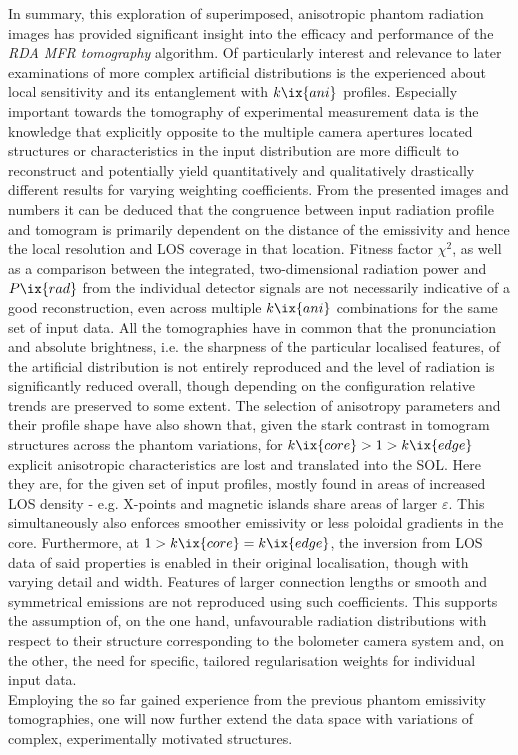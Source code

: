                In summary, this exploration of superimposed, anisotropic phantom radiation images has provided significant insight into the efficacy and performance of the \textit{RDA MFR tomography} algorithm. Of particularly interest and relevance to later examinations of more complex artificial distributions is the experienced about local sensitivity and its entanglement with $k\ix{ani}$ profiles. Especially important towards the tomography of experimental measurement data is the knowledge that explicitly opposite to the multiple camera apertures located structures or characteristics in the input distribution are more difficult to reconstruct and potentially yield quantitatively and qualitatively drastically different results for varying weighting coefficients. From the presented images and numbers it can be deduced that the congruence between input radiation profile and tomogram is primarily dependent on the distance of the emissivity and hence the local resolution and LOS coverage in that location. Fitness factor $\chi^{2}$, as well as a comparison between the integrated, two-dimensional radiation power and $P\ix{rad}$ from the individual detector signals are not necessarily indicative of a good reconstruction, even across multiple $k\ix{ani}$ combinations for the same set of input data. All the tomographies have in common that the pronunciation and absolute brightness, i.e. the sharpness of the particular localised features, of the artificial distribution is not entirely reproduced and the level of radiation is significantly reduced overall, though depending on the configuration relative trends are preserved to some extent. The selection of anisotropy parameters and their profile shape have also shown that, given the stark contrast in tomogram structures across the phantom variations, for $k\ix{core}>1>k\ix{edge}$ explicit anisotropic characteristics are lost and translated into the SOL. Here they are, for the given set of input profiles, mostly found in areas of increased LOS density - e.g. X-points and magnetic islands share areas of larger $\varepsilon$. This simultaneously also enforces smoother emissivity or less poloidal gradients in the core. Furthermore, at $1>k\ix{core}=k\ix{edge}$, the inversion from LOS data of said properties is enabled in their original localisation, though with varying detail and width. Features of larger connection lengths or smooth and symmetrical emissions are not reproduced using such coefficients. This supports the assumption of, on the one hand, unfavourable radiation distributions with respect to their structure corresponding to the bolometer camera system and, on the other, the need for specific, tailored regularisation weights for individual input data.\\%
                Employing the so far gained experience from the previous phantom emissivity tomographies, one will now further extend the data space with variations of complex, experimentally motivated structures.%
%
